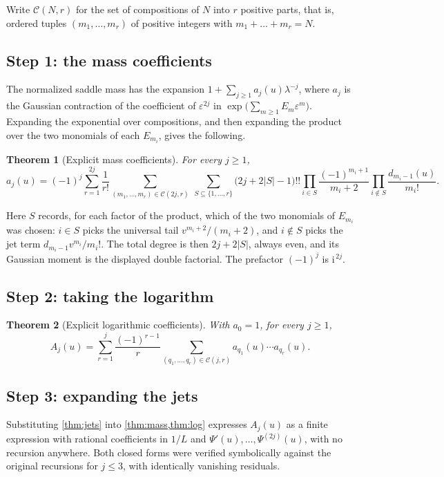 \documentclass[11pt,oneside]{article}
\newtheorem{theorem}{Theorem}[section]
\theoremstyle{definition}
\theoremstyle{remark}
\newcommand{\ii}{\mathrm i}
\begin{document}
Write $\mathcal C(N,r)$ for the set of compositions of $N$ into $r$ positive
parts, that is, ordered tuples $(m_1,\dots,m_r)$ of positive integers with
$m_1+\dots+m_r=N$.

\subsection{Step 1: the mass coefficients}

The normalized saddle mass has the expansion
$1+\sum_{j\ge1}a_j(u)\lambda^{-j}$, where $a_j$ is the Gaussian contraction of
the coefficient of $\varepsilon^{2j}$ in
$\exp\bigl(\sum_{m\ge1}E_m\varepsilon^m\bigr)$.  Expanding the exponential over
compositions, and then expanding the product over the two monomials of each
$E_{m_i}$, gives the following.

\begin{theorem}[Explicit mass coefficients]\label{thm:mass}
For every $j\ge1$,
\[
  a_j(u)=(-1)^j\sum_{r=1}^{2j}\frac1{r!}
    \sum_{(m_1,\dots,m_r)\in\mathcal C(2j,r)}\ \sum_{S\subseteq\{1,\dots,r\}}
      \bigl(2j+2|S|-1\bigr)!!
      \prod_{i\in S}\frac{(-1)^{m_i+1}}{m_i+2}
      \prod_{i\notin S}\frac{d_{m_i-1}(u)}{m_i!}.
\]
\end{theorem}

Here $S$ records, for each factor of the product, which of the two monomials of
$E_{m_i}$ was chosen: $i\in S$ picks the universal tail
$v^{m_i+2}/(m_i+2)$, and $i\notin S$ picks the jet term
$d_{m_i-1}v^{m_i}/m_i!$.  The total degree is then $2j+2|S|$, always even, and
its Gaussian moment is the displayed double factorial.  The prefactor $(-1)^j$
is $\ii^{\,2j}$.

\subsection{Step 2: taking the logarithm}

\begin{theorem}[Explicit logarithmic coefficients]\label{thm:log}
With $a_0=1$, for every $j\ge1$,
\[
  A_j(u)=\sum_{r=1}^{j}\frac{(-1)^{r-1}}{r}
    \sum_{(q_1,\dots,q_r)\in\mathcal C(j,r)}a_{q_1}(u)\cdots a_{q_r}(u).
\]
\end{theorem}

\subsection{Step 3: expanding the jets}

Substituting \cref{thm:jets} into \cref{thm:mass,thm:log} expresses $A_j(u)$ as
a finite expression with rational coefficients in $1/L$ and
$\Psi'(u),\dots,\Psi^{(2j)}(u)$, with no recursion anywhere.  Both closed forms
were verified symbolically against the original recursions for $j\le3$, with
identically vanishing residuals.
\end{document}
